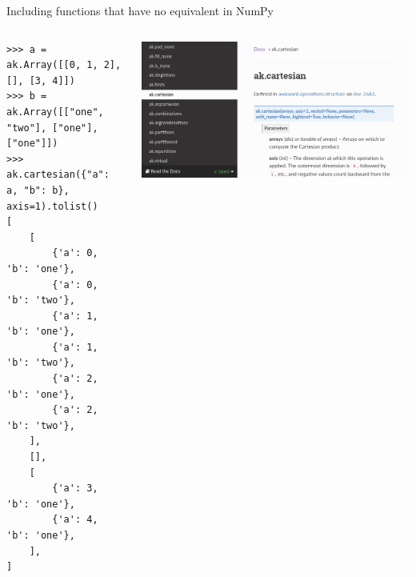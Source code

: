 \documentclass[aspectratio=169]{beamer}
\begin{document}
\begin{frame}[fragile]{Including functions that have no equivalent in NumPy}
\small
\vspace{-0.75 cm}
\begin{columns}
\begin{verbatim}
>>> a = ak.Array([[0, 1, 2], [], [3, 4]])
>>> b = ak.Array([["one", "two"], ["one"], ["one"]])
>>> ak.cartesian({"a": a, "b": b}, axis=1).tolist()
[
    [
        {'a': 0, 'b': 'one'},
        {'a': 0, 'b': 'two'},
        {'a': 1, 'b': 'one'},
        {'a': 1, 'b': 'two'},
        {'a': 2, 'b': 'one'},
        {'a': 2, 'b': 'two'},
    ],
    [],
    [
        {'a': 3, 'b': 'one'},
        {'a': 4, 'b': 'one'},
    ],
]
\end{verbatim}

\vspace{-5.5 cm}
\hfill\includegraphics[height=4 cm]{docs-cartesian.png}
\end{columns}
\end{frame}
\end{document}
